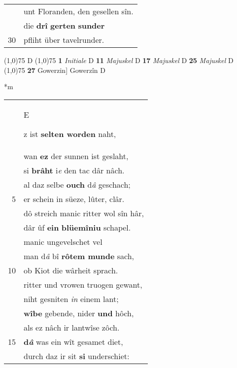 \documentclass[8pt,a4paper,notitlepage]{article}
\begin{document}
\begin{table}[ht]
\begin{minipage}[t]{0.5\linewidth}
\begin{tabular}{rl}
 & unt Floranden, den gesellen sîn.\\ 
 & die \textbf{drî} \textbf{gerten} \textbf{sunder}\\ 
30 & pfliht über tavelrunder.\\ 
\end{tabular}
\scriptsize
\line(1,0){75} \newline
D \newline
\line(1,0){75} \newline
\textbf{1} \textit{Initiale} D  \textbf{11} \textit{Majuskel} D  \textbf{17} \textit{Majuskel} D  \textbf{25} \textit{Majuskel} D  \newline
\line(1,0){75} \newline
\textbf{27} Gowerzin] Gowerzîn D \newline
\end{minipage}
\hspace{0.5cm}
\begin{minipage}[t]{0.5\linewidth}
\small
\begin{center}*m
\end{center}
\begin{tabular}{rl}
 & \begin{large}E\end{large}z ist \textbf{selten worden} naht,\\ 
 & wan \textbf{ez} der sunnen ist geslaht,\\ 
 & si \textbf{brâht} i\textit{e} den tac dâr nâch.\\ 
 & al daz selbe \textbf{ouch} d\textit{â} geschach;\\ 
5 & er schein in süeze, lûter, clâr.\\ 
 & dô streich manic ritter wol sîn hâr,\\ 
 & dâr ûf \textbf{ein} \textbf{blüemîniu} schapel.\\ 
 & manic ungevelschet vel\\ 
 & man d\textit{â} bî \textbf{rôtem munde} sach,\\ 
10 & ob Kiot die wârheit sprach.\\ 
 & ritter und vrowen truogen gewant,\\ 
 & niht gesniten \textit{in} einem lant;\\ 
 & \textbf{wîbe} gebende, nider \textbf{und} hôch,\\ 
 & als ez nâch ir lantwîse zôch.\\ 
15 & \textbf{d\textit{â}} was ein wît gesamet diet,\\ 
 & durch daz ir sit \textbf{si} underschiet:\\ 

\end{tabular}
\end{minipage}
\end{table}
\end{document}
